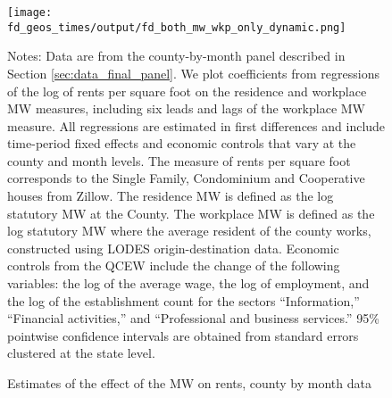
\begin{figure}[h!]
    \centering
    \caption{Estimates of the effect of the MW on rents, county by month data}
    \label{fig:dynamic_county_month}

	\texttt{[image: fd\_geos\_times/output/fd\_both\_mw\_wkp\_only\_dynamic.png]}

    \begin{minipage}{.95\textwidth} \footnotesize
        \vspace{3mm}
        Notes:
        Data are from the county-by-month panel described in Section 
        \ref{sec:data_final_panel}.
        We plot coefficients from regressions of the log of rents per
        square foot on the residence and workplace MW measures, including 
        six leads and lags of the workplace MW measure.
        All regressions are estimated in first differences and include 
        time-period fixed effects and economic controls that vary at the 
        county and month levels.
        The measure of rents per square foot corresponds to the Single Family, 
        Condominium and Cooperative houses from Zillow.
        The residence MW is defined as the log statutory MW at the County.
        The workplace MW is defined as the log statutory MW where the average 
        resident of the county works, constructed using LODES 
        origin-destination data.
        Economic controls from the QCEW include the change of the following 
        variables: the log of the average wage, the log of employment, and the 
        log of the establishment count for the sectors ``Information,'' 
        ``Financial activities,'' and ``Professional and business services.''
        95\% pointwise confidence intervals are obtained from standard errors 
        clustered at the state level.
    \end{minipage}
\end{figure}
